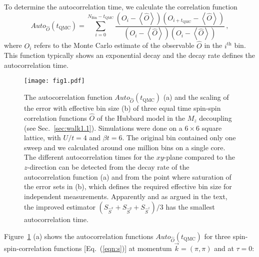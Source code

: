 \documentclass{SciPost}
\begin{document}
To determine the autocorrelation time, we calculate the correlation function
\begin{equation}
\label{eqn:autocorrel}
	Auto_{\hat{O}}(t_{\textrm{QMC}})=\sum_{i=0}^{N_{\textrm{Bin}}-t_{\textrm{QMC}}}\frac{\left(O_i-\left\langle \hat{O}\right\rangle \right)\left(O_{i+t_{\textrm{QMC}}}-\left\langle \hat{O}\right\rangle \right)}{\left(O_i-\left\langle \hat{O}\right\rangle \right)\left(O_{i}-\left\langle \hat{O}\right\rangle \right)}\, ,
\end{equation}
where $O_i$ refers to the Monte Carlo estimate of the observable $\hat{O}$ in the $i^{\text{th}}$ bin. This function typically shows an exponential decay and the decay rate defines the autocorrelation time.
%
\begin{figure}
\texttt{[image: fig1.pdf]}
	\caption{\label{fig_autocorr}
	        The autocorrelation function $Auto_{\hat{O}}(t_{\textrm{QMC}})$ (a) and the scaling of the error with effective bin size (b) of three equal time spin-spin correlation functions $\hat{O}$ of the Hubbard model in the $M_z$ decoupling (see Sec.~\ref{sec:walk1.1}). Simulations were done on a $ 6 \times 6$ square lattice, with  $U/t=4$ and $\beta t = 6$.  The original bin contained only one sweep and we calculated around one million bins on a single core. The different  autocorrelation times for the $xy$-plane compared to the $z$-direction can be detected from the decay rate of the autocorrelation function (a) and from the point where saturation of the error sets in (b), which defines the required effective bin size for independent measurements. Apparently and as argued in the text, the  improved estimator $(S_{\hat{S}^{x}} + S_{\hat{S}^{y}}+ S_{\hat{S}^{z}})/3$  has the smallest autocorrelation time.
 }
\end{figure}
%
Figure~\ref{fig_autocorr} (a) shows the autocorrelation functions $Auto_{\hat{O}}(t_{\textrm{QMC}})$ for three spin-spin-correlation functions [Eq.~(\ref{eqn:s})] at momentum $\vec{k}=(\pi,\pi)$ and at $\tau=0$: 
\end{document}
